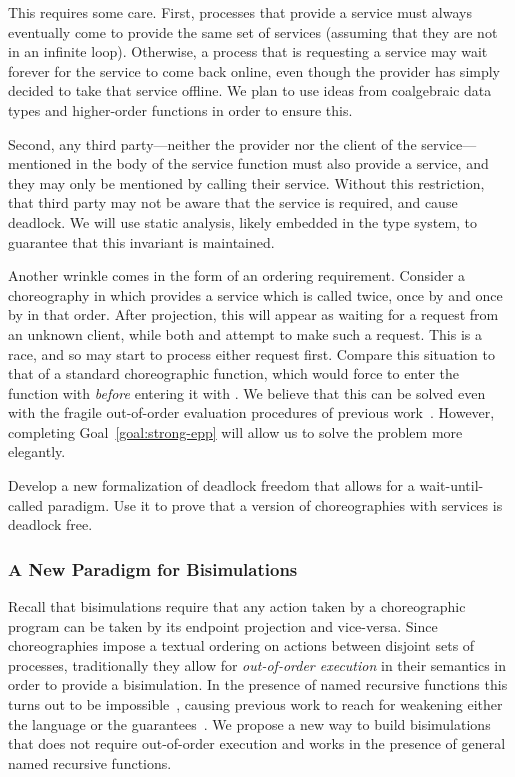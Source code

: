 This requires some care.
First, processes that provide a service must always eventually come to provide the same set of services (assuming that they are not in an infinite loop).
Otherwise, a process that is requesting a service may wait forever for the service to come back online, even though the provider has simply decided to take that service offline.
We plan to use ideas from coalgebraic data types and higher-order functions in order to ensure this.

Second, any third party---neither the provider nor the client of the service---mentioned in the body of the service function must also provide a service, and they may only be mentioned by calling their service.
Without this restriction, that third party may not be aware that the service is required, and cause deadlock.
We will use static analysis, likely embedded in the type system, to guarantee that this invariant is maintained.

Another wrinkle comes in the form of an ordering requirement.
Consider a choreography in which \Alice{} provides a service which is called twice, once by \Bob{} and once by \Cathy{} in that order.
After projection, this will appear as \Alice{} waiting for a request from an unknown client, while both \Bob{} and \Cathy{} attempt to make such a request.
This is a race, and so \Alice{} may start to process either request first.
Compare this situation to that of a standard choreographic function, which would force \Alice{} to enter the function with \Bob{} \emph{before} entering it with \Cathy{}.
We believe that this can be solved even with the fragile out-of-order evaluation procedures of previous work~\cite{CruzFilipeGLMP23,Montesi23,HirschG22}.
However, completing Goal~\ref{goal:strong-epp} will allow us to solve the problem more elegantly.

\begin{goal}
  \label{goal:wait-until-called}
  Develop a new formalization of deadlock freedom that allows for a wait-until-called paradigm.
  Use it to prove that a version of choreographies with services is deadlock free.
\end{goal}

\subsubsection{A New Paradigm for Bisimulations}
\label{sec:new-parad-bisim}

Recall that bisimulations require that any action taken by a choreographic program can be taken by its endpoint projection and vice-versa.
Since choreographies impose a textual ordering on actions between disjoint sets of processes, traditionally they allow for \emph{out-of-order execution} in their semantics in order to provide a bisimulation.
In the presence of named recursive functions this turns out to be impossible~\cite{SamuelsonHC25}, causing previous work to reach for weakening either the language or the guarantees~\cite{HirschG22,CruzFilipeGLMP22,SamuelsonHC25}.
We propose a new way to build bisimulations that does not require out-of-order execution and works in the presence of general named recursive functions.

